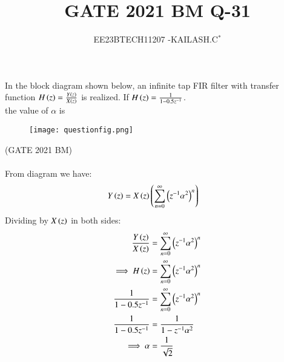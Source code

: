 \documentclass[journal,12pt,twocolumn]{IEEEtran}
\theoremstyle{remark}
\begin{document}

\vspace{3cm}

\title{GATE 2021 BM Q-31}
\author{EE23BTECH11207 -KAILASH.C$^{*}$%
}
\maketitle
\newpage
\bigskip

\renewcommand{\thefigure}{\theenumi}
\renewcommand{\thetable}{\theenumi}
In the block diagram shown below, an infinite tap FIR filter with transfer function $H\left(z\right)=\frac{Y\left(z\right)}{X\left(z\right)}$ is realized. If $H\left(z\right)=\frac{1}{1-0.5z^{-1}}$.\\the value of $\alpha$ is
\begin{figure}[h]
    \texttt{[image: questionfig.png]}
    \label{fig:question31bm}
\end{figure} \hfill(GATE 2021 BM)\\
\solution
\fi
\\
From diagram we have:
\begin{align}
    Y\left(z\right)&=X\left(z\right)\left(\sum_{n=0}^{\infty}\left(z^{-1}\alpha^{2}\right)^n\right)\label{eq:311_bm}
\end{align}
Dividing by $X\left(z\right)$ in both sides:
\begin{align}
    \frac{Y\left(z\right)}{X\left(z\right)}&=\sum_{n=0}^{\infty}\left(z^{-1}\alpha^{2}\right)^n\label{eq:312_bm}\\
    \implies H\left(z\right)&=\sum_{n=0}^{\infty}\left(z^{-1}\alpha^{2}\right)^n\label{eq:313_bm}\\
    \frac{1}{1-0.5z^{-1}}&=\sum_{n=0}^{\infty}\left(z^{-1}\alpha^{2}\right)^n\label{eq:314_bm}\\
\frac{1}{1-0.5z^{-1}}&=\frac{1}{1-z^{-1}\alpha^{2}}\label{eq:315_bm}\\
\implies \alpha&=\frac{1}{\sqrt{2}}\label{eq:316_bm}
\end{align}
\end{document}
